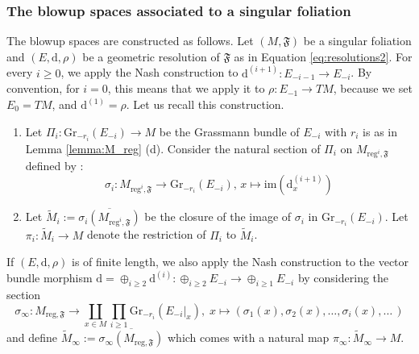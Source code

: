 \documentclass[10pt]{article}
\theoremstyle{plain}
\theoremstyle{definition}
\theoremstyle{remark}
\newcommand{\dd}{\mathrm{d}}
\begin{document}
\subsubsection{The blowup spaces associated to a singular foliation}
The blowup spaces are constructed as follows. Let $(M, \mathfrak F)$ be a singular foliation and $(E, \dd, \rho)$ be a geometric resolution of $\mathfrak F$ as in Equation \eqref{eq:resolutions2}. For every $i\geq 0$, we apply the Nash construction to $\dd^{(i+1)}\colon E_{-i-1}\to E_{-i}$. By convention, for $i=0$, this means that we apply it to $\rho\colon E_{-1}\to TM$, because we set $ E_0=TM$, and $ \dd^{(1)}=\rho$. Let us recall this construction.
\begin{enumerate}
    \item[(a)]  Let $ \Pi_i\colon \mathrm{Gr}_{-r_i}(E_{-i})\longrightarrow M$ be the Grassmann bundle of $E_{-i}$ with $r_i$ is as in Lemma \ref{lemma:M_reg} (d). Consider the natural section of $\Pi_i$ on $ M_{\mathrm{reg}^{i}, \mathfrak  F}$ defined by : \begin{equation}
    \sigma_i\colon M_{\mathrm{reg}^{i}, \mathfrak  F}\longrightarrow \mathrm{Gr}_{-r_i}({E_{-i}}),\, x\longmapsto \mathrm{im}\left(\dd^{(i+1)}_x\right)
\end{equation}
\item[(b)] Let $\widetilde{M}_i:= \overline{\sigma_i(M_{\mathrm{reg}^{i}, \mathfrak  F})}$ be the closure of the image of $\sigma_i$ in $\mathrm{Gr}_{-r_i}(E_{-i})$.  Let $\pi_i\colon \widetilde{M}_i\longrightarrow M$ denote the restriction of $\Pi_i$ to  $\widetilde{M}_i$. 
\end{enumerate}If $(E,\dd, \rho)$ is of finite length, we also apply the Nash construction to  the vector bundle morphism $\dd=\oplus_{i\geq 2}\dd^{(i)}\colon \oplus_{i\geq 2}E_{-i}\to \oplus_{i\geq 1}E_{-i}$ by considering the section $$\sigma_{\infty}\colon M_{\mathrm{reg},\mathfrak  F}\longrightarrow\coprod_{x\in M}\prod_{ i\geq 1}\mathrm{Gr}_{-r_i}({E_{-i}}|_x),\;x\mapsto(\sigma_1(x),\sigma_2(x), \ldots, \sigma_i(x),\ldots \,)$$ and define $\widetilde{M}_{\infty} :=\overline{\sigma_{\infty}(M_{\mathrm{reg}, \mathfrak  F})}$ which comes with a natural map $\pi_\infty\colon \widetilde M_\infty\to M$. 
\end{document}
